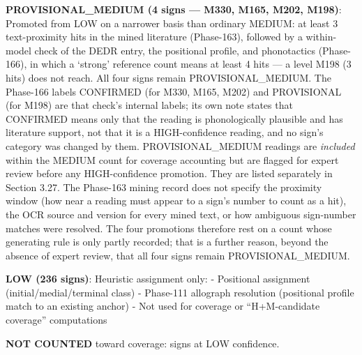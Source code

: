 \documentclass[
]{article}
\begin{document}
\textbf{PROVISIONAL\_MEDIUM (4 signs --- M330, M165, M202, M198)}: Promoted from LOW on a narrower basis than ordinary MEDIUM: at least 3 text-proximity hits in the mined literature (Phase-163), followed by a within-model check of the DEDR entry, the positional profile, and phonotactics (Phase-166), in which a `strong' reference count means at least 4 hits --- a level M198 (3 hits) does not reach. All four signs remain PROVISIONAL\_MEDIUM. The Phase-166 labels CONFIRMED (for M330, M165, M202) and PROVISIONAL (for M198) are that check's internal labels; its own note states that CONFIRMED means only that the reading is phonologically plausible and has literature support, not that it is a HIGH-confidence reading, and no sign's category was changed by them. PROVISIONAL\_MEDIUM readings are
\emph{included} within the MEDIUM count for coverage accounting but are flagged for
expert review before any HIGH-confidence promotion. They are listed separately in Section 3.27. The Phase-163 mining record does not specify the proximity window (how near a reading must appear to a sign's number to count as a hit), the OCR source and version for every mined text, or how ambiguous sign-number matches were resolved. The four promotions therefore rest on a count whose generating rule is only partly recorded; that is a further reason, beyond the absence of expert review, that all four signs remain PROVISIONAL\_MEDIUM.

\textbf{LOW (236 signs)}: Heuristic assignment only: - Positional
assignment (initial/medial/terminal class) - Phase-111 allograph
resolution (positional profile match to an existing anchor) - Not used
for coverage or ``H+M-candidate coverage'' computations

\textbf{NOT COUNTED} toward coverage: signs at LOW confidence.
\end{document}

